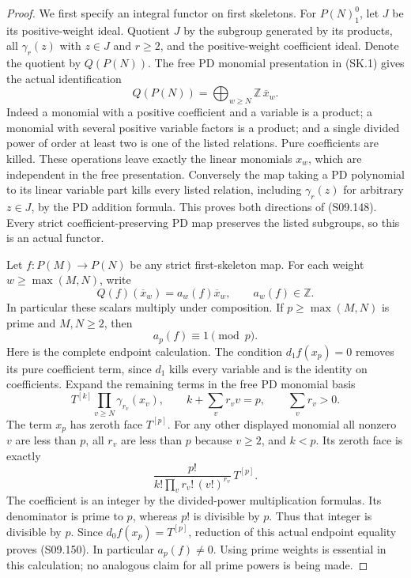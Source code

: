 \begin{proof}
We first specify an integral functor on first skeletons.
For $P(N)_1^0$, let $J$ be its positive-weight ideal.
Quotient $J$ by the subgroup generated by its products,
all $\gamma_r(z)$ with $z\in J$ and $r\geq2$, and the
positive-weight coefficient ideal. Denote the quotient by
$Q(P(N))$. The free PD monomial presentation in (SK.1)
gives the actual identification
\[
             Q(P(N))=\bigoplus_{w\geq N}\mathbb Z\,\overline{x}_w.
 \tag{S09.148}
\]
Indeed a monomial with a positive coefficient and a variable
is a product; a monomial with several positive variable
factors is a product; and a single divided power of order
at least two is one of the listed relations. Pure coefficients
are killed. These operations leave exactly the linear
monomials $x_w$, which are independent in the free presentation.
Conversely the map taking a PD polynomial to its linear
variable part kills every listed relation, including
$\gamma_r(z)$ for arbitrary $z\in J$, by the PD addition
formula. This proves both directions of (S09.148).
Every strict coefficient-preserving PD map preserves the
listed subgroups, so this is an actual functor.

Let $f:P(M)\to P(N)$ be any strict first-skeleton map.
For each weight $w\geq\max(M,N)$, write
\[
                    Q(f)(\overline{x}_w)
                         =a_w(f)\overline{x}_w,
                    \qquad a_w(f)\in\mathbb Z.
 \tag{S09.149}
\]
In particular these scalars multiply under composition.
If $p\geq\max(M,N)$ is prime and $M,N\geq2$, then
\[
                            a_p(f)\equiv1\pmod p.
 \tag{S09.150}
\]
Here is the complete endpoint calculation. The condition
$d_1f(x_p)=0$ removes its pure coefficient term, since
$d_1$ kills every variable and is the identity on coefficients.
Expand the remaining terms in the free PD monomial basis
\[
       T^{[k]}\prod_{v\geq N}\gamma_{r_v}(x_v),
               \qquad k+\sum_v r_vv=p,
               \qquad\sum_v r_v>0.
\]
The term $x_p$ has zeroth face $T^{[p]}$.
For any other displayed monomial all nonzero $v$ are
less than $p$, all $r_v$ are less than $p$ because
$v\geq2$, and $k<p$. Its zeroth face is exactly
\[
        \frac{p!}{k!\prod_v r_v!\,(v!)^{r_v}}\,T^{[p]}.
 \tag{S09.151}
\]
The coefficient is an integer by the divided-power
multiplication formulas. Its denominator is prime to $p$,
whereas $p!$ is divisible by $p$. Thus that integer is
divisible by $p$. Since $d_0f(x_p)=T^{[p]}$, reduction
of this actual endpoint equality proves (S09.150).
In particular $a_p(f)\ne0$.
Using prime weights is essential in this calculation;
no analogous claim for all prime powers is being made.


\end{proof}

